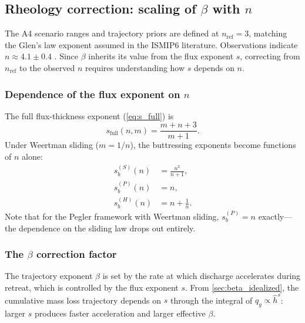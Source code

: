 \documentclass[11pt]{article}
\newcommand{\qg}{q_g}
\newcommand{\hhat}{\hat{h}}
\begin{document}
\subsection{Rheology correction: scaling of $\beta$ with $n$}
\label{sec:beta_rheology}

The A4 scenario ranges and trajectory priors are defined at $n_{\mathrm{ref}} = 3$, matching the Glen's law exponent assumed in the ISMIP6 literature. Observations indicate $n \approx 4.1 \pm 0.4$ \citep{Millstein2022}. Since $\beta$ inherits its value from the flux exponent $s$, correcting from $n_{\mathrm{ref}}$ to the observed $n$ requires understanding how $s$ depends on $n$.

\subsubsection{Dependence of the flux exponent on $n$}

The full flux-thickness exponent (\cref{eq:s_full}) is
\begin{equation}
	s_{\mathrm{full}}(n, m) = \frac{m + n + 3}{m + 1}.
	\label{eq:sfull_repeat}
\end{equation}
Under Weertman sliding ($m = 1/n$), the buttressing exponents become functions of $n$ alone:
\begin{align}
	s_b^{(S)}(n) &= \frac{n^2}{n+1}, \label{eq:sb_S_weertman} \\
	s_b^{(P)}(n) &= n, \label{eq:sb_P_weertman} \\
	s_b^{(H)}(n) &= n + \frac{1}{n}. \label{eq:sb_H_weertman}
\end{align}
Note that for the Pegler framework with Weertman sliding, $s_b^{(P)} = n$ exactly---the dependence on the sliding law drops out entirely.

\subsubsection{The $\beta$ correction factor}

The trajectory exponent $\beta$ is set by the rate at which discharge accelerates during retreat, which is controlled by the flux exponent $s$. From \cref{sec:beta_idealized}, the cumulative mass loss trajectory depends on $s$ through the integral of $\qg \propto \hhat^s$: larger $s$ produces faster acceleration and larger effective $\beta$.
\end{document}
